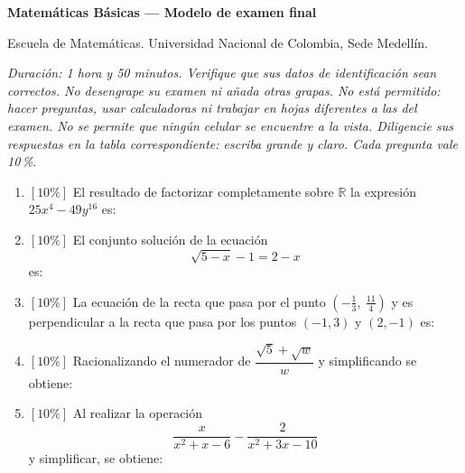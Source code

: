 \documentclass[11pt]{article}
\newcommand{\resp}{\par\vspace{2pt}\noindent\underline{\hspace{9cm}}\par\vspace{6pt}}
\begin{document}
{\large\bfseries Matemáticas Básicas --- Modelo de examen final}

\medskip
\noindent Escuela de Matemáticas. Universidad Nacional de Colombia, Sede Medellín.

\medskip
\noindent\textit{Duración: 1 hora y 50 minutos. Verifique que sus datos de identificación sean correctos. No desengrape su examen ni añada otras grapas. No está permitido: hacer preguntas, usar calculadoras ni trabajar en hojas diferentes a las del examen. No se permite que ningún celular se encuentre a la vista. Diligencie sus respuestas en la tabla correspondiente: escriba grande y claro. Cada pregunta vale 10\,\%.}

\begin{enumerate}
\item $[10\%]$ El resultado de factorizar completamente sobre $\mathbb{R}$ la expresión $25x^4 - 49y^{16}$ es:
\resp

\item $[10\%]$ El conjunto solución de la ecuación
\[
\sqrt{5 - x} - 1 = 2 - x
\]
es:
\resp

\item $[10\%]$ La ecuación de la recta que pasa por el punto $\left(-\tfrac{1}{3},\ \tfrac{11}{4}\right)$ y es perpendicular a la recta que pasa por los puntos $(-1, 3)$ y $(2, -1)$ es:

\item $[10\%]$ Racionalizando el numerador de $\dfrac{\sqrt5 + \sqrt w}{w}$ y simplificando se obtiene:
\resp

\item $[10\%]$ Al realizar la operación
\[
\frac{x}{x^2 + x - 6} - \frac{2}{x^2 + 3x - 10}
\]
y simplificar, se obtiene:


\end{enumerate}
\end{document}
